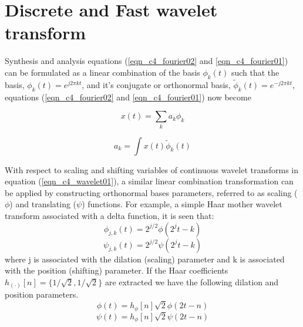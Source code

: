 \section{Discrete and Fast wavelet transform}
Synthesis and analysis equations (\ref{eqn_c4_fourier02} and \ref{eqn_c4_fourier01}) can be formulated as a linear combination of the basis $\phi_k(t)$ such that the basis, $\phi_k(t)=e^{j2\pi kt}$, and it's conjugate or orthonormal basis, $\tilde{\phi}_k(t)=e^{-j2\pi kt}$, equations (\ref{eqn_c4_fourier02} and \ref{eqn_c4_fourier01}) now become

\begin{equation}
x(t)=\sum_{k}a_k\phi_k
\label{eqn_c4_dwt02}
\end{equation}

\begin{equation}
a_k=\int x(t)\tilde{\phi}_k(t)
\label{eqn_c4_dwt01}
\end{equation}

With respect to scaling and shifting variables of continuous wavelet transforms in equation (\ref{eqn_c4_wavelet01}), a similar linear combination transformation can be applied by constructing orthonormal bases parameters, referred to as scaling ($\phi$) and translating ($\psi$) functions. For example, a simple Haar mother wavelet transform associated with a delta function, it is seen that:
\begin{equation}
\phi_{j,k}(t)=2^{j/2}\phi(2^jt-k)
\label{eqn_c4_dwt03}
\end{equation}
\begin{equation}
\psi_{j,k}(t)=2^{j/2}\psi(2^jt-k)
\label{eqn_c4_dwt04}
\end{equation}
where j is associated with the dilation (scaling) parameter and k is associated with the position (shifting) parameter. If the Haar coefficients $h_{(\cdot)}[n]=\{1/\sqrt{2},1/\sqrt{2}\}$ are extracted we have the following dilation and position parameters.
\begin{equation}
\phi(t)=h_\phi[n]\sqrt{2}\phi(2t-n)
\label{eqn_c4_dwt05}
\end{equation}
\begin{equation}
\psi(t)=h_\phi[n]\sqrt{2}\psi(2t-n)
\label{eqn_c4_dwt06}
\end{equation}

